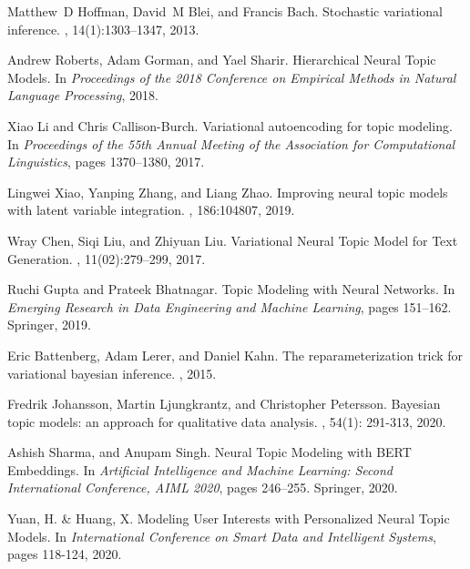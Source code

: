 \documentclass{article}
\begin{document}
\begin{thebibliography}{20}
Matthew~D Hoffman, David~M Blei, and Francis Bach.
\newblock Stochastic variational inference.
, 14(1):1303--1347, 2013.

Andrew Roberts, Adam  Gorman, and Yael  Sharir.
\newblock Hierarchical Neural Topic Models.
\newblock In {\em Proceedings of the 2018 Conference on Empirical Methods in Natural Language Processing},  2018.

Xiao Li and Chris Callison-Burch.
\newblock Variational autoencoding for topic modeling.
\newblock In {\em Proceedings of the 55th Annual Meeting of the Association for Computational Linguistics}, pages 1370--1380, 2017.


Lingwei Xiao, Yanping Zhang, and Liang Zhao.
\newblock Improving neural topic models with latent variable integration.
, 186:104807, 2019.

Wray Chen, Siqi Liu, and Zhiyuan Liu.
\newblock Variational Neural Topic Model for Text Generation.
, 11(02):279--299, 2017.


Ruchi Gupta and Prateek Bhatnagar.
\newblock Topic Modeling with Neural Networks.
\newblock In {\em Emerging Research in Data Engineering and Machine Learning}, pages 151--162. Springer, 2019.


Eric Battenberg, Adam Lerer, and Daniel  Kahn.
\newblock The reparameterization trick for variational bayesian inference.
, 2015.


Fredrik Johansson, Martin Ljungkrantz, and Christopher Petersson.
\newblock Bayesian topic models: an approach for qualitative data analysis.
, 54(1): 291-313, 2020.

Ashish Sharma, and Anupam Singh.
\newblock Neural Topic Modeling with BERT Embeddings.
\newblock In {\em Artificial Intelligence and Machine Learning: Second International Conference, AIML 2020}, pages 246--255. Springer, 2020.

Yuan, H. & Huang, X.
\newblock Modeling User Interests with Personalized Neural Topic Models.
\newblock In {\em International Conference on Smart Data and Intelligent Systems}, pages 118-124, 2020.

\end{thebibliography}
\end{document}

